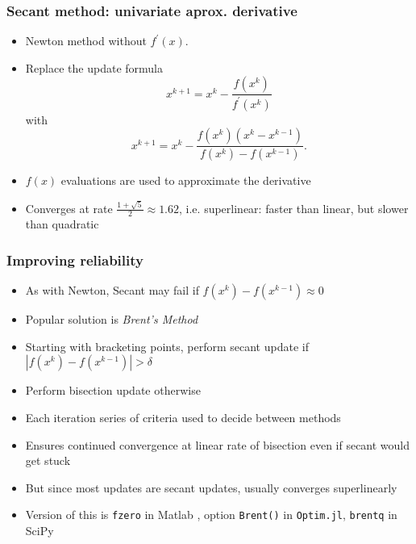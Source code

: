 \documentclass[bigger]{beamer}
\begin{document}
\begin{frame}%

\frametitle{Secant method: univariate aprox. derivative}

\begin{itemize}
\item Newton method without $f^{\prime }(x)$.

\item Replace the update formula%
\begin{equation*}
x^{k+1}=x^{k}-\frac{f(x^{k})}{f^{\prime }(x^{k})}
\end{equation*}%
with 
\begin{equation*}
x^{k+1}=x^{k}-\frac{f(x^{k})(x^{k}-x^{k-1})}{f(x^{k})-f(x^{k-1})}.
\end{equation*}

\item $f(x)$ evaluations are used to approximate the derivative

\item Converges at rate $\frac{1+\sqrt{5}}{2}\approx 1.62$, i.e.
superlinear: \newline
faster than linear, but slower than quadratic
\end{itemize}


\end{frame}%

\begin{frame}%
\frametitle{Improving reliability}
\begin{itemize}
\item As with Newton, Secant may fail if $f(x^{k})-f(x^{k-1})\approx 0$
\item Popular solution is \emph{Brent's Method}
\item Starting with bracketing points, perform secant update if $\left\vert f(x^{k})-f(x^{k-1})\right\vert>\delta$
\item Perform bisection update otherwise
\item Each iteration series of criteria used to decide between methods
\item Ensures continued convergence at linear rate of bisection even if secant would get stuck
\item But since most updates are secant updates, usually converges superlinearly
\item Version of this is \texttt{fzero} in Matlab , option \texttt{Brent()} in \texttt{Optim.jl}, \texttt{brentq} in SciPy

\end{itemize}

\end{frame}%
\end{document}
